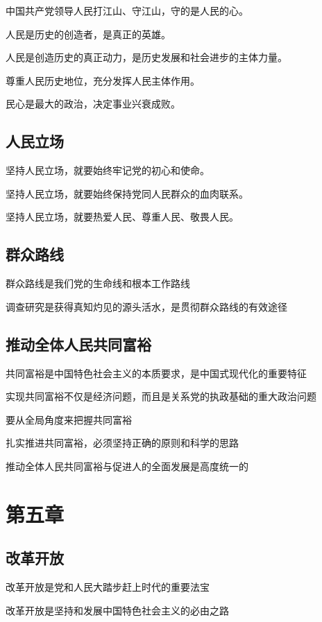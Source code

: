 \documentclass[11pt, a4paper]{article}
\begin{document}
中国共产党领导人民打江山、守江山，守的是人民的心。

人民是历史的创造者，是真正的英雄。

人民是创造历史的真正动力，是历史发展和社会进步的主体力量。

尊重人民历史地位，充分发挥人民主体作用。

民心是最大的政治，决定事业兴衰成败。

\subsection*{人民立场}

坚持人民立场，就要始终牢记党的初心和使命。

坚持人民立场，就要始终保持党同人民群众的血肉联系。

坚持人民立场，就要热爱人民、尊重人民、敬畏人民。

\subsection*{群众路线}

群众路线是我们党的生命线和根本工作路线

调查研究是获得真知灼见的源头活水，是贯彻群众路线的有效途径

\subsection*{推动全体人民共同富裕}

共同富裕是中国特色社会主义的本质要求，是中国式现代化的重要特征

实现共同富裕不仅是经济问题，而且是关系党的执政基础的重大政治问题

要从全局角度来把握共同富裕

扎实推进共同富裕，必须坚持正确的原则和科学的思路

推动全体人民共同富裕与促进人的全面发展是高度统一的

\section*{第五章}

\subsection*{改革开放}

改革开放是党和人民大踏步赶上时代的重要法宝

改革开放是坚持和发展中国特色社会主义的必由之路
\end{document}
